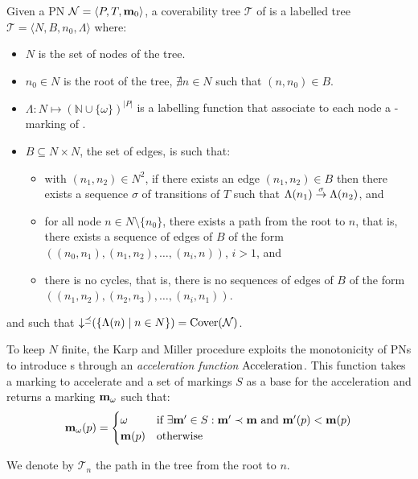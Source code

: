 \begin{defi}
  Given a \ac{PN} $\mathcal{N} = \langle P,T, \mathbf{m}_0\rangle$, a coverability tree $\mathcal{T}$ of \tupleN is a labelled tree $\mathcal{T} = \langle N, B, n_0, \Lambda\rangle$ where:
  \begin{itemize}
    \item $N$ is the set of nodes of the tree.%
    \item $n_0 \in N$ is the root of the tree,  $\nexists n \in N$ such that $(n, n_0) \in B$.
    \item $\Lambda : N \mapsto (\mathbb{N} \cup \{\omega\})^{|P|}$ is a labelling function that associate to each node a \textomega-marking of \tupleN.
    \item $B \subseteq N \times N$, the set of edges, is such that:
      \begin{itemize}
        \item with $(n_1, n_2) \in N^2$, if there exists an edge $(n_1, n_2) \in B$ then there exists a sequence $\sigma$ of transitions of $T$ such that $\Lambda(n_1) \stackrel{\sigma}{\to} \Lambda(n_2)$, and
        \item for all node $n \in N \setminus \{n_0\}$, there exists a path from the root to $n$, that is, there exists a sequence of edges of $B$ of the form $((n_0, n_1), (n_1, n_2), \dots, (n_{i}, n))$, $i > 1$, and
        \item there is no cycles, that is, there is no sequences of edges of $B$ of the form $((n_1, n_2), (n_2, n_3), \dots, (n_i, n_1))$.
      \end{itemize}
  \end{itemize}
  and such that $\operatorname{\downarrow^\preceq}(\{\Lambda(n) \mid n \in N\}) = \operatorname{Cover}(\mathcal{N})$.
\end{defi}

To keep $N$ finite, the Karp and Miller procedure exploits the monotonicity of \acp{PN} to introduce \omark{}s through an \emph{acceleration function} $\operatorname{Acceleration}$.
This function takes a marking \marq to accelerate and a set of markings $S$ as a base  for the acceleration and returns a marking $\mathbf{m}_\omega$ such that:
\[
  \mathbf{m}_\omega(p) = 
  \begin{cases}
    \omega    &\text{if } \exists \mathbf{m'} \in S : \mathbf{m'} \prec \mathbf{m} \text{ and } \mathbf{m'}(p) < \mathbf{m}(p) \\
    \mathbf{m}(p)  &\text{otherwise}
  \end{cases}
\]

We denote by $\mathscr{T}_n$ the path in the tree from the root to $n$.

